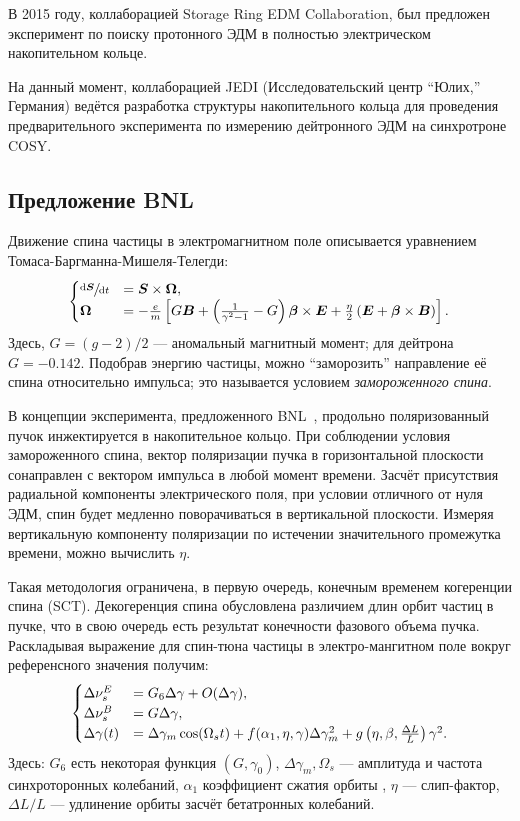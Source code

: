 \documentclass{article}
\newcommand{\bld}{\boldsymbol}
\begin{document}
	В 2015 году, коллаборацией Storage Ring EDM Collaboration, был предложен эксперимент по поиску протонного ЭДМ в полностью электрическом накопительном кольце.~\cite{Proton_EDM}
	
	На данный момент, коллаборацией JEDI (Исследовательский центр ``Юлих,'' Германия) ведётся разработка структуры накопительного кольца для проведения предварительного эксперимента по измерению дейтронного ЭДМ на синхротроне COSY.
	
	\subsection{Предложение BNL}\label{sec:BNL_Proposal}
	Движение спина частицы в электромагнитном поле описывается уравнением Томаса-Баргманна-Мишеля-Телегди:
	\begin{equation*}
	\begin{cases}
	\sfrac{\td\bld S}{\td t} &=\bld S \times\bld \Omega,\\
	\bld \Omega &= -\frac em \bkt*{G\bld B + \bkt{\frac 1 {\gamma^2 - 1} - G}\bld \beta \times\bld E + \frac\eta2 \bkt{\bld E +\bld\beta\times\bld B}}.
	\end{cases}
	\end{equation*}
	Здесь, $G = (g-2)/2$ --- аномальный магнитный момент; для дейтрона $G = -0.142$. Подобрав энергию частицы, можно ``заморозить'' направление её спина относительно импульса; это называется условием \emph{замороженного спина}.
	
	В концепции эксперимента, предложенного BNL~\cite{BNL}, продольно поляризованный пучок инжектируется в накопительное кольцо. При соблюдении условия замороженного спина, вектор поляризации пучка в горизонтальной плоскости сонаправлен с вектором импульса в любой момент времени. Засчёт присутствия радиальной компоненты электрического поля, при условии отличного от нуля ЭДМ, спин будет медленно поворачиваться в вертикальной плоскости. Измеряя вертикальную компоненту поляризации по истечении значительного промежутка времени, можно вычислить $\eta$. 
	
	Такая методология ограничена, в первую очередь, конечным временем когеренции спина (SCT). Декогеренция спина обусловлена различием длин орбит частиц в пучке, что в свою очередь есть результат конечности фазового объема пучка. Раскладывая выражение для спин-тюна частицы в электро-мангитном поле вокруг референсного значения получим:~\cite{SenichevRuPAC2016}
	\begin{equation*}
		\begin{cases}
		\Delta\nu_s^E &= G_6\Delta\gamma + O(\Delta\gamma),\\
		\Delta\nu_s^B &= G\Delta\gamma,\\
		\Delta\gamma(t) &= \Delta\gamma_m\cos(\Omega_s t) + f(\alpha_1, \eta, \gamma)\Delta\gamma_m^2 + g\bkt{\eta, \beta, \frac{\Delta L}{L}}\gamma^2.
		\end{cases}
	\end{equation*}
	Здесь: $G_6$ есть некоторая функция $(G, \gamma_0)$, $\Delta\gamma_m, \Omega_s$ --- амплитуда и частота синхроторонных колебаний, $\alpha_1$ коэффициент сжатия орбиты , $\eta$ --- слип-фактор, $\Delta L/L$ --- удлинение орбиты засчёт бетатронных колебаний.
	
\end{document}
